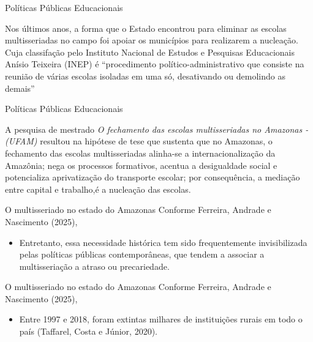 \documentclass[12pt]{beamer}
\begin{document}
		\begin{frame}{Políticas Públicas Educacionais}
			\justifying
			
			Nos últimos anos, a forma que o Estado encontrou para eliminar as escolas multisseriadas no campo foi apoiar os municípios para realizarem a nucleação. Cuja classifação pelo Instituto Nacional de Estudos e Pesquisas Educacionais Anísio Teixeira (INEP) é “procedimento político-administrativo que consiste na reunião de várias escolas isoladas em uma só, desativando ou demolindo as demais”
		\end{frame}
		
		\begin{frame}{Políticas Públicas Educacionais}
			\justifying
			
			A pesquisa de mestrado \textit{O fechamento das escolas multisseriadas no Amazonas - (UFAM)} resultou na hipótese de tese que sustenta que no Amazonas, o fechamento das escolas multisseriadas alinha-se a internacionalização da Amazônia; nega os processos formativos, acentua a desigualdade social e potencializa aprivatização do transporte escolar; por consequência, a mediação entre capital e trabalho,é a nucleação das escolas.
		\end{frame}
		
		\begin{frame}{O multisseriado no estado do Amazonas}
			\justifying
			Conforme Ferreira, Andrade e Nascimento (2025),
			\begin{itemize}
				\item Entretanto,   essa   necessidade   histórica   tem   sido   frequentemente invisibilizada pelas políticas públicas contemporâneas, que tendem a associar a multisseriação  a  atraso  ou  precariedade. 
				
				
			\end{itemize}
		\end{frame}
		
		\begin{frame}{O multisseriado no estado do Amazonas}
			\justifying
			Conforme Ferreira, Andrade e Nascimento (2025),
			\begin{itemize}
				\item Entre  1997  e  2018,  foram  extintas  milhares  de instituições  rurais  em  todo  o  país  (Taffarel,  Costa  e  Júnior,  2020).  
				
				
			
			
			\end{itemize}
		\end{frame}
		
\end{document}
